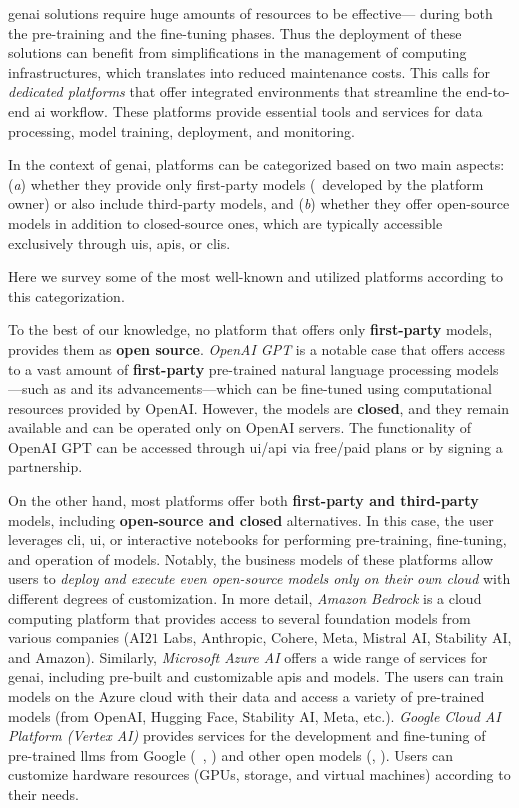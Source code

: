 \gls{genai} solutions require huge amounts of resources to be effective---%
during both the pre-training and the fine-tuning phases.
Thus the deployment of these solutions can benefit from simplifications in the management of computing infrastructures, which translates into reduced maintenance costs.
This calls for
\emph{dedicated platforms} that offer integrated environments that streamline the end-to-end \gls{ai} workflow.
These platforms provide essential tools and services for data processing, model training, deployment, and monitoring.

%
In the context of \gls{genai}, platforms can be categorized based on two main aspects: (\textit{a}) whether they provide only first-party models (\ie~developed by the platform owner) or also include third-party models, and
(\textit{b}) whether they offer open-source models in addition to closed-source ones, which are typically accessible exclusively through \glspl{ui}, \glspl{api}, or \glspl{cli}.
%

Here we survey some of the most well-known and utilized platforms according to this categorization.

To the best of our knowledge, no platform that offers only \textbf{first-party} models, provides them as \textbf{open source}.
\emph{OpenAI GPT} is a notable case that offers access to a vast amount of \textbf{first-party} 
pre-trained natural language processing models---such as  and its advancements---which can be fine-tuned using computational resources provided by OpenAI. 
However, the models are \textbf{closed}, and they remain available and can be operated only on OpenAI servers. 
The functionality of OpenAI GPT can be accessed through \gls{ui}/\gls{api} via free/paid plans or by signing a partnership.

On the other hand, most platforms offer both \textbf{first-party and third-party} models, including \textbf{open-source and closed} alternatives. 
In this case, the user leverages \gls{cli}, \gls{ui}, or interactive notebooks for performing pre-training, fine-tuning, and operation of 
models.
Notably, the business models of these platforms allow users to \emph{deploy and execute even open-source models only on their own cloud} 
with different degrees of customization.
In more detail, \emph{Amazon Bedrock} is a cloud computing platform that provides access to several foundation models from various companies (\eg AI$21$ Labs, Anthropic, Cohere, Meta, Mistral AI, Stability AI, and Amazon). 
Similarly, \emph{Microsoft Azure AI} offers a wide range of services for \gls{genai}, including pre-built and customizable \glspl{api} and models. 
The users can train models on the Azure cloud with their data and access a variety of pre-trained models (from OpenAI, Hugging Face, Stability AI, Meta, etc.).
\emph{Google Cloud AI Platform (Vertex AI)} provides services for the development and fine-tuning of pre-trained \glspl{llm} from Google (\ie~, ) and other open models (\eg {}, ). Users can customize hardware resources (\eg GPUs, storage, and virtual machines) according to their needs.


